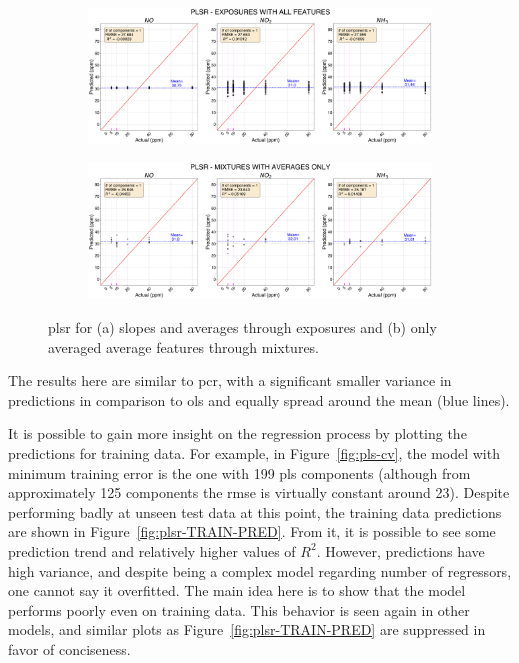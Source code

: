 \begin{figure}[!htb]
	\centering
	
	\begin{subfigure}[t]{1\textwidth}
		\includegraphics[width=1\linewidth]{../figures/plsr-act-vs-pred.png}
		\caption{}
		\label{fig:pls-act-vs-pred} 
	\end{subfigure}
	
	\begin{subfigure}[t]{1\textwidth}
		\includegraphics[width=1\linewidth]{../figures/plsr-act-vs-pred-avg-feat.png}
		\caption{}
		\label{fig:pls-act-vs-pred-avg-feat}
	\end{subfigure}
	
	\caption{\acrshort{plsr} for (a) slopes and averages through exposures and (b) only averaged average features through mixtures.}
	\label{fig:plsr-actual-vs-pred-both}
\end{figure}

The results here are similar to \acrshort{pcr}, with a significant smaller variance in predictions in comparison to \acrshort{ols} and equally spread around the mean (blue lines).

It is possible to gain more insight on the regression process by plotting the predictions for training data. For example, in Figure~\ref{fig:pls-cv}, the model with minimum training error is the one with 199 \acrshort{pls} components (although from approximately 125 components the \acrshort{rmse} is virtually constant around 23). Despite performing badly at unseen test data at this point, the training data predictions are shown in Figure~\ref{fig:plsr-TRAIN-PRED}. From it, it is possible to see some prediction trend and relatively higher values of $R^2$. However, predictions have high variance, and despite being a complex model regarding number of regressors, one cannot say it overfitted. The main idea here is to show that the model performs poorly even on training data. This behavior is seen again in other models, and similar plots as Figure~\ref{fig:plsr-TRAIN-PRED} are suppressed in favor of conciseness.

